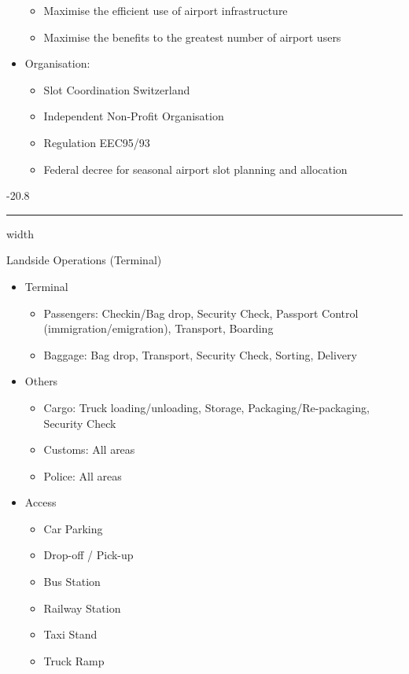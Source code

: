 \documentclass[9pt, landscape, fleqn]{scrartcl}
\makeatletter
\renewcommand{\subsubsection}{\@startsection{subsubsection}{1}{0mm}%
{-2\baselineskip}{0.8\baselineskip}%
{\hrule depth 0.2pt width\columnwidth\vspace*{1.2em}\normalsize\bfseries\rmfamily}}
\makeatother
\begin{document}
\begin{multicols*}{3}
\begin{itemize}
\begin{itemize}
        \item Maximise the efficient use of airport infrastructure 
        \item Maximise the benefits to the greatest number of airport users 
    \end{itemize}
    \item Organisation:
    \begin{itemize}
        \item Slot Coordination Switzerland
        \item Independent Non-Profit Organisation
        \item Regulation EEC95/93
        \item Federal decree for seasonal airport slot planning and allocation 
    \end{itemize}
\end{itemize}
\subsubsection{Landside Operations (Terminal)}
\begin{itemize}
    \item Terminal
    \begin{itemize}
        \item Passengers: Checkin/Bag drop, Security Check, Passport Control (immigration/emigration), Transport, Boarding 
        \item Baggage: Bag drop, Transport, Security Check, Sorting, Delivery  
    \end{itemize} 
    \item Others
    \begin{itemize}
        \item Cargo: Truck loading/unloading, Storage, Packaging/Re-packaging, Security Check 
        \item Customs: All areas 
        \item Police: All areas 
    \end{itemize}
    \item Access 
    \begin{itemize}
        \item Car Parking 
        \item Drop-off / Pick-up 
        \item Bus Station 
        \item Railway Station 
        \item Taxi Stand 
        \item Truck Ramp 
    \end{itemize}
\end{itemize}

\end{multicols*}
\end{document}
